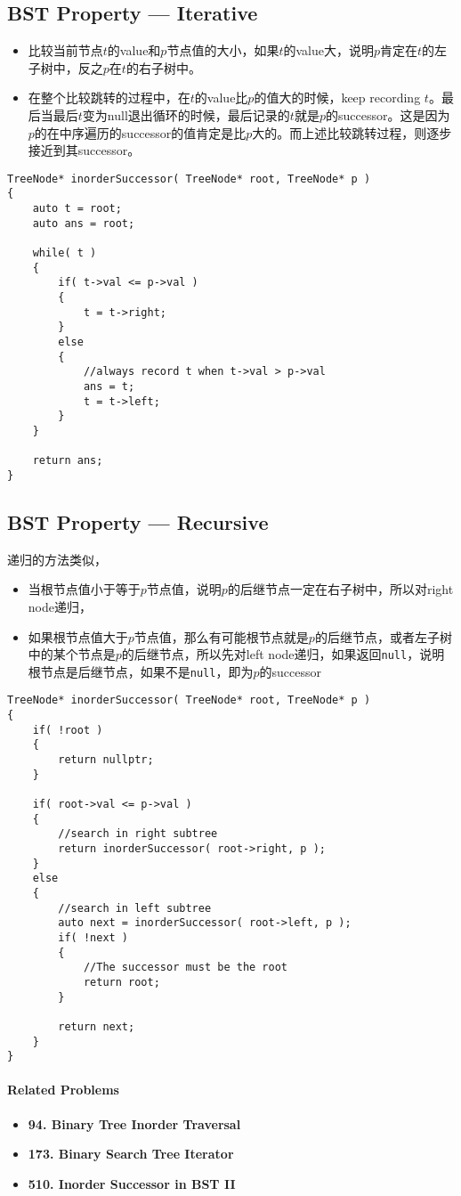 \subsection{BST Property --- Iterative}
\begin{itemize}
    \item 比较当前节点$t$的value和$p$节点值的大小，如果$t$的value大，说明$p$肯定在$t$的左子树中，反之$p$在$t$的右子树中。
    \item 在整个比较跳转的过程中，在$t$的value比$p$的值大的时候，keep recording $t$。最后当最后$t$变为null退出循环的时候，最后记录的$t$就是$p$的successor。这是因为$p$的在中序遍历的successor的值肯定是比$p$大的。而上述比较跳转过程，则逐步接近到其successor。
\end{itemize}
\begin{lstlisting}[style=customc, caption={BST Property --- Iterative}]
TreeNode* inorderSuccessor( TreeNode* root, TreeNode* p )
{
    auto t = root;
    auto ans = root;

    while( t )
    {
        if( t->val <= p->val )
        {
            t = t->right;
        }
        else
        {
            //always record t when t->val > p->val
            ans = t;
            t = t->left;
        }
    }

    return ans;
}
\end{lstlisting}
\subsection{BST Property --- Recursive}
递归的方法类似，
\begin{itemize}
    \item 当根节点值小于等于$p$节点值，说明$p$的后继节点一定在右子树中，所以对right node递归，
    \item 如果根节点值大于$p$节点值，那么有可能根节点就是$p$的后继节点，或者左子树中的某个节点是$p$的后继节点，所以先对left node递归，如果返回\texttt{null}，说明根节点是后继节点，如果不是\texttt{null}，即为$p$的successor
\end{itemize}
\begin{lstlisting}[style=customc, caption={BST Property --- Recursive}]
TreeNode* inorderSuccessor( TreeNode* root, TreeNode* p )
{
    if( !root )
    {
        return nullptr;
    }

    if( root->val <= p->val )
    {
        //search in right subtree
        return inorderSuccessor( root->right, p );
    }
    else
    {
        //search in left subtree
        auto next = inorderSuccessor( root->left, p );
        if( !next )
        {
            //The successor must be the root
            return root;
        }

        return next;
    }
}
\end{lstlisting}

\paragraph{Related Problems}
\begin{itemize}
\item \textbf{94. Binary Tree Inorder Traversal}
\item \textbf{173. Binary Search Tree Iterator}
\item \textbf{510. Inorder Successor in BST II}
\end{itemize}